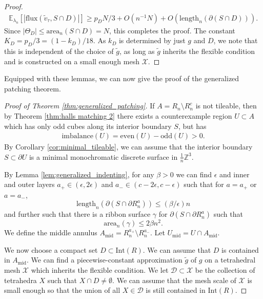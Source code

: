 \documentclass[11pt]{article}
\theoremstyle{remark}
\theoremstyle{definition}
\newcommand{\mc}[1]{\mathcal{#1}}
\newcommand{\m}[1]{\mathbb{#1}}
\begin{document}
\begin{proof}
    \begin{align*}
        \m E_{\lambda_n}[|\text{flux}(\widetilde v_\tau,S\cap D)|] \geq p_D N /3 + O(n^{-1}N) + O(\text{length}_n(\partial (S\cap D))). 
    \end{align*}
    Since $|\Theta_D|\leq \text{area}_n(S\cap D)=N$, this completes the proof. The constant $K_D = p_D / 3= (1-k_D)/18$. As $k_D$ is determined by just $g$ and $D$, we note that this is independent of the choice of $\widetilde g$, as long as $\widetilde g$ inherits the flexible condition and is constructed on a small enough mesh $\mc X$. 
\end{proof}

Equipped with these lemmas, we can now give the proof of the generalized patching theorem. 

\begin{proof}[Proof of Theorem \ref{thm:generalized_patching}]
    If $A = R_n\setminus R_n^c$ is not tileable, then by Theorem \ref{thm:halls matching 2} there exists a counterexample region $U\subset A$ which has only odd cubes along its interior boundary $S$, but has 
    \begin{align*}
        \text{imbalance}(U) = \text{even}(U) - \text{odd}(U) > 0. 
    \end{align*}
    By Corollary \ref{cor:minimal_tileable}, we can assume that the interior boundary $S\subset \partial U$ is a minimal monochromatic discrete surface in $\frac{1}{n} \m Z^3$. 

    By Lemma \ref{lem:generalized_indenting}, for any $\beta>0$ we can find $\epsilon$ and inner and outer layers $a_+\in (\epsilon, 2\epsilon)$ and $a_-\in (c-2\epsilon, c-\epsilon)$ such that for $a=a_+$ or $a=a_-$,
    \begin{equation}\label{eq:length_generalized}
        \text{length}_n(\partial (S\cap \partial R_n^a)) \leq (\beta/\epsilon)n
    \end{equation}
    and further such that there is a ribbon surface $\gamma$ for $\partial (S\cap \partial R_n^a)$ such that 
    \begin{equation}\label{eq:ribbon}
        \text{area}_n(\gamma) \leq 2\beta n^2. 
    \end{equation}
    We define the middle annulus $A_{\text{mid}} = R_n^{a_+}\setminus R_n^{a_-}$. Let $U_{\text{mid}}=U\cap A_{\text{mid}}$. 
    
    We now choose a compact set $D\subset \text{Int}(R)$. We can assume that $D$ is contained in $A_{\text{mid}}$. We can find a piecewise-constant approximation $\widetilde g$ of $g$ on a tetrahedral mesh $\mc X$ which inherits the flexible condition. We let $\mc D\subset \mc X$ be the collection of tetrahedra $X$ such that $X\cap D\neq \emptyset$. We can assume that the mesh scale of $\mc X$ is small enough so that the union of all $X\in \mc D$ is still contained in $\text{Int}(R)$. 
        

\end{proof}
\end{document}
